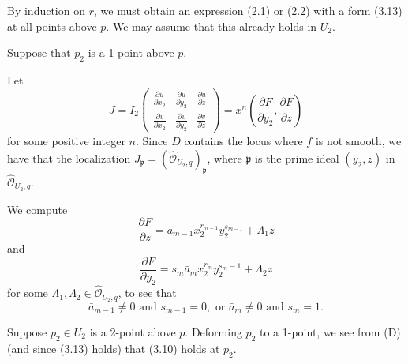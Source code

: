 \documentclass[11pt]{article}
\theoremstyle{plain}
\newcommand{\Oh}[1]{\widehat{\mathcal{O}}_{#1}}
\begin{document}
By induction on $r$, we must obtain an expression (2.1) or (2.2) with a form (3.13) at all points above $p$. We may assume that this already holds in $U_2$.

Suppose that $p_2$ is a 1-point above $p$.


Let
\[
J = I_2 \left( \begin{smallmatrix}
\frac{\partial u}{\partial x_2} & \frac{\partial u}{\partial y_2} & \frac{\partial u}{\partial z} \\[2pt]
\frac{\partial v}{\partial x_2} & \frac{\partial v}{\partial y_2} & \frac{\partial v}{\partial z}
\end{smallmatrix} \right) = x^n \left( \frac{\partial F}{\partial y_2}, \frac{\partial F}{\partial z} \right)
\]
for some positive integer $n$. Since $D$ contains the locus where $f$ is not smooth, we have that the localization $J_{\mathfrak{p}} = (\Oh{U_2,q})_{\mathfrak{p}}$, where $\mathfrak{p}$ is the prime ideal $(y_2, z)$ in $\Oh{U_2,q}$.

We compute
\[
\frac{\partial F}{\partial z} = \bar{a}_{m-1} x_2^{r_{m-1}} y_2^{s_{m-1}} + \Lambda_1 z
\]
and
\[
\frac{\partial F}{\partial y_2} = s_m \bar{a}_m x_2^{r_m} y_2^{s_m-1} + \Lambda_2 z
\]
for some $\Lambda_1, \Lambda_2 \in \Oh{U_2,q}$, to see that
\begin{equation}
\bar{a}_{m-1} \neq 0 \text{ and } s_{m-1} = 0, \text{ or } \bar{a}_m \neq 0 \text{ and } s_m = 1.
\tag{D}
\end{equation}

Suppose $p_2 \in U_2$ is a 2-point above $p$. Deforming $p_2$ to a 1-point, we see from (D) (and since (3.13) holds) that (3.10) holds at $p_2$.
\end{document}
